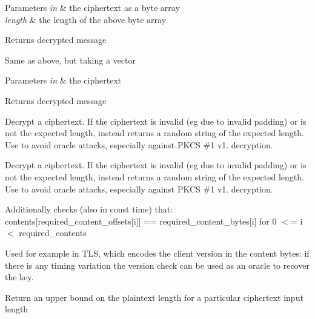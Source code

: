 \begin{DoxyParams}{Parameters}
{\em in} & the ciphertext as a byte array \\
\hline
{\em length} & the length of the above byte array \\
\hline
\end{DoxyParams}
\begin{DoxyReturn}{Returns}
decrypted message
\end{DoxyReturn}
Same as above, but taking a vector 
\begin{DoxyParams}{Parameters}
{\em in} & the ciphertext \\
\hline
\end{DoxyParams}
\begin{DoxyReturn}{Returns}
decrypted message
\end{DoxyReturn}
Decrypt a ciphertext. If the ciphertext is invalid (eg due to invalid padding) or is not the expected length, instead returns a random string of the expected length. Use to avoid oracle attacks, especially against P\+K\+CS \#1 v1. decryption.

Decrypt a ciphertext. If the ciphertext is invalid (eg due to invalid padding) or is not the expected length, instead returns a random string of the expected length. Use to avoid oracle attacks, especially against P\+K\+CS \#1 v1. decryption.

Additionally checks (also in const time) that\+: contents\mbox{[}required\+\_\+content\+\_\+offsets\mbox{[}i\mbox{]}\mbox{]} == required\+\_\+content\+\_\+bytes\mbox{[}i\mbox{]} for 0 $<$= i $<$ required\+\_\+contents

Used for example in T\+LS, which encodes the client version in the content bytes\+: if there is any timing variation the version check can be used as an oracle to recover the key.

Return an upper bound on the plaintext length for a particular ciphertext input length

